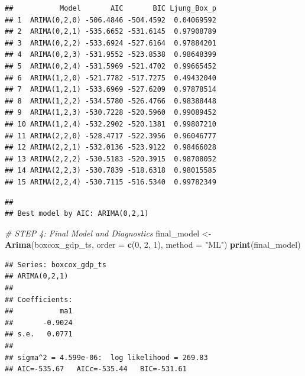 \documentclass[
]{article}
\newenvironment{Shaded}{\begin{snugshade}}{\end{snugshade}}
\newcommand{\AttributeTok}[1]{\textcolor[rgb]{0.13,0.29,0.53}{#1}}
\newcommand{\CommentTok}[1]{\textcolor[rgb]{0.56,0.35,0.01}{\textit{#1}}}
\newcommand{\DecValTok}[1]{\textcolor[rgb]{0.00,0.00,0.81}{#1}}
\newcommand{\FunctionTok}[1]{\textcolor[rgb]{0.13,0.29,0.53}{\textbf{#1}}}
\newcommand{\NormalTok}[1]{#1}
\newcommand{\OtherTok}[1]{\textcolor[rgb]{0.56,0.35,0.01}{#1}}
\newcommand{\SpecialCharTok}[1]{\textcolor[rgb]{0.81,0.36,0.00}{\textbf{#1}}}
\newcommand{\StringTok}[1]{\textcolor[rgb]{0.31,0.60,0.02}{#1}}
\begin{document}
\begin{verbatim}
##           Model       AIC       BIC Ljung_Box_p
## 1  ARIMA(0,2,0) -506.4846 -504.4592  0.04069592
## 2  ARIMA(0,2,1) -535.6652 -531.6145  0.97908789
## 3  ARIMA(0,2,2) -533.6924 -527.6164  0.97884201
## 4  ARIMA(0,2,3) -531.9552 -523.8538  0.98648399
## 5  ARIMA(0,2,4) -531.5969 -521.4702  0.99665452
## 6  ARIMA(1,2,0) -521.7782 -517.7275  0.49432040
## 7  ARIMA(1,2,1) -533.6969 -527.6209  0.97878514
## 8  ARIMA(1,2,2) -534.5780 -526.4766  0.98388448
## 9  ARIMA(1,2,3) -530.7228 -520.5960  0.99089452
## 10 ARIMA(1,2,4) -532.2902 -520.1381  0.99807210
## 11 ARIMA(2,2,0) -528.4717 -522.3956  0.96046777
## 12 ARIMA(2,2,1) -532.0136 -523.9122  0.98466028
## 13 ARIMA(2,2,2) -530.5183 -520.3915  0.98708052
## 14 ARIMA(2,2,3) -530.7839 -518.6318  0.98015585
## 15 ARIMA(2,2,4) -530.7115 -516.5340  0.99782349
\end{verbatim}

\begin{Shaded}
\end{Shaded}

\begin{verbatim}
## 
## Best model by AIC: ARIMA(0,2,1)
\end{verbatim}

\begin{Shaded}
\begin{Highlighting}[]
\CommentTok{\# STEP 4: Final Model and Diagnostics}
\NormalTok{final\_model }\OtherTok{\textless{}{-}} \FunctionTok{Arima}\NormalTok{(boxcox\_gdp\_ts, }\AttributeTok{order =} \FunctionTok{c}\NormalTok{(}\DecValTok{0}\NormalTok{, }\DecValTok{2}\NormalTok{, }\DecValTok{1}\NormalTok{), }\AttributeTok{method =} \StringTok{"ML"}\NormalTok{)}
\FunctionTok{print}\NormalTok{(final\_model)}
\end{Highlighting}
\end{Shaded}

\begin{verbatim}
## Series: boxcox_gdp_ts 
## ARIMA(0,2,1) 
## 
## Coefficients:
##           ma1
##       -0.9024
## s.e.   0.0771
## 
## sigma^2 = 4.599e-06:  log likelihood = 269.83
## AIC=-535.67   AICc=-535.44   BIC=-531.61
\end{verbatim}
\end{document}
